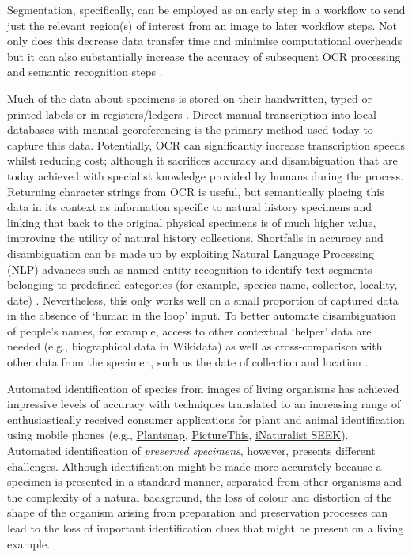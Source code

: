Segmentation, specifically, can be employed as an early step in a
workflow to send just the relevant region(s) of interest from an image
to later workflow steps. Not only does this decrease data transfer time
and minimise computational overheads but it can also substantially
increase the accuracy of subsequent OCR processing and semantic
recognition steps \cite{ch8-18}.

Much of the data about specimens is stored on their handwritten, typed
or printed labels or in registers/ledgers \cite{ch8-34}. Direct manual
transcription into local databases with manual georeferencing is the
primary method used today to capture this data. Potentially, OCR can
significantly increase transcription speeds whilst reducing cost;
although it sacrifices accuracy and disambiguation that are today
achieved with specialist knowledge provided by humans during the
process. Returning character strings from OCR is useful, but
semantically placing this data in its context as information specific to
natural history specimens and linking that back to the original physical
specimens is of much higher value, improving the utility of natural
history collections. Shortfalls in accuracy and disambiguation can be
made up by exploiting Natural Language Processing (NLP) advances such as
named entity recognition to identify text segments belonging to
predefined categories (for example, species name, collector, locality,
date) \cite{ch8-18}. Nevertheless, this only works well on a small proportion
of captured data in the absence of `human in the loop' input. To better
automate disambiguation of people's names, for example, access to other
contextual `helper' data are needed (e.g., biographical data in
Wikidata) as well as cross-comparison with other data from the specimen,
such as the date of collection and location \cite{ch8-35}.

Automated identification of species from images of living organisms has
achieved impressive levels of accuracy 
\cite{ch8-36,ch8-37,ch8-38,ch8-39,ch8-40,ch8-41} with techniques
translated to an increasing range of enthusiastically received consumer
applications for plant and animal identification using mobile phones
(e.g., \href{https://www.plantsnap.com/}{Plantsnap},
\href{https://www.picturethisai.com/}{PictureThis},
\href{https://www.inaturalist.org/pages/seek_app}{iNaturalist SEEK}).
Automated identification of \emph{preserved specimens}, however,
presents different challenges. Although identification might be made
more accurately because a specimen is presented in a standard manner,
separated from other organisms and the complexity of a natural
background, the loss of colour and distortion of the shape of the
organism arising from preparation and preservation processes can lead to
the loss of important identification clues that might be present on a
living example.

